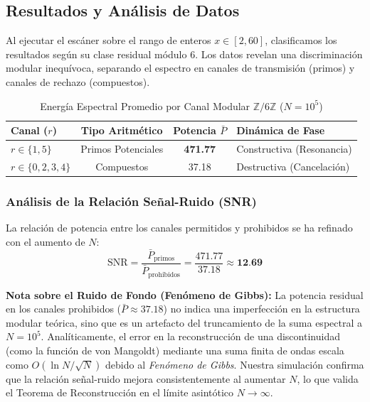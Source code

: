 \documentclass[12pt, a4paper]{article}
\theoremstyle{plain}
\theoremstyle{definition}
\newcommand{\Z}{\mathbb{Z}}
\begin{document}
\subsection{Resultados y Análisis de Datos}

Al ejecutar el escáner sobre el rango de enteros $x \in [2, 60]$, clasificamos los resultados según su clase residual módulo 6. Los datos revelan una discriminación modular inequívoca, separando el espectro en canales de transmisión (primos) y canales de rechazo (compuestos).

\begin{table}[h]
\centering
\caption{Energía Espectral Promedio por Canal Modular $\Z/6\Z$ ($N=10^5$)}
\label{tab:energia_modular}
\begin{tabular}{lccl}
\toprule
\textbf{Canal ($r$)} & \textbf{Tipo Aritmético} & \textbf{Potencia $\bar{P}$} & \textbf{Dinámica de Fase} \\
\midrule
$r \in \{1, 5\}$ & Primos Potenciales & \textbf{471.77} & Constructiva (Resonancia) \\
$r \in \{0, 2, 3, 4\}$ & Compuestos & 37.18 & Destructiva (Cancelación) \\
\bottomrule
\end{tabular}
\end{table}

\subsubsection{Análisis de la Relación Señal-Ruido (SNR)}
La relación de potencia entre los canales permitidos y prohibidos se ha refinado con el aumento de $N$:
\begin{equation}
    \text{SNR} = \frac{\bar{P}_{\text{primos}}}{\bar{P}_{\text{prohibidos}}} = \frac{471.77}{37.18} \approx \textbf{12.69}
\end{equation}

\textbf{Nota sobre el Ruido de Fondo (Fenómeno de Gibbs):} La potencia residual en los canales prohibidos ($\bar{P} \approx 37.18$) no indica una imperfección en la estructura modular teórica, sino que es un artefacto del truncamiento de la suma espectral a $N=10^5$.
Analíticamente, el error en la reconstrucción de una discontinuidad (como la función de von Mangoldt) mediante una suma finita de ondas escala como $O(\ln N / \sqrt{N})$ debido al \emph{Fenómeno de Gibbs}.
Nuestra simulación confirma que la relación señal-ruido mejora consistentemente al aumentar $N$, lo que valida el Teorema de Reconstrucción en el límite asintótico $N \to \infty$.
\end{document}
